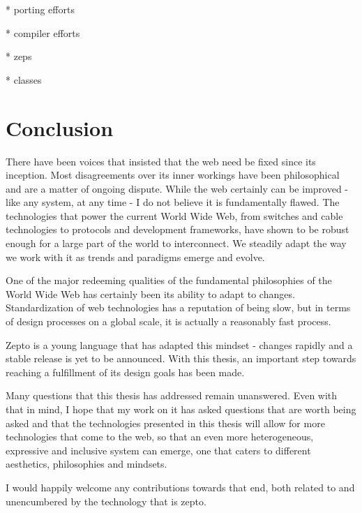 \documentclass[oneside,11pt,xetex]{scrbook}
\begin{document}
* porting efforts

* compiler efforts

* zeps

* classes

\chapter{Conclusion}
\label{chap:conclusion}

There have been voices that insisted that the web need be fixed
since its inception. Most disagreements over its inner workings
have been philosophical and are a matter of ongoing dispute.
While the web certainly can be improved - like any system,
at any time - I do not believe it is fundamentally flawed. The
technologies that power the current World Wide Web, from switches
and cable technologies to protocols and development frameworks,
have shown to be robust enough for a large part of the world
to interconnect. We steadily adapt the way we work with it
as trends and paradigms emerge and evolve.

One of the major redeeming qualities of the fundamental
philosophies of the World Wide Web has certainly been
its ability to adapt to changes. Standardization of web
technologies has a reputation of being slow, but in terms
of design processes on a global scale, it is actually a
reasonably fast process.

Zepto is a young language that has adapted this mindset -
changes rapidly and a stable release is yet to be announced.
With this thesis, an important step towards reaching a fulfillment
of its design goals has been made.

Many questions that this thesis has addressed remain unanswered.
Even with that in mind, I hope that my work on it has asked
questions that are worth being asked and that the technologies
presented in this thesis will allow for more technologies that
come to the web, so that an even more heterogeneous,
expressive and inclusive system can emerge, one that
caters to different aesthetics, philosophies and mindsets.

I would happily welcome any contributions towards that
end, both related to and unencumbered by the technology
that is zepto.



\backmatter


\printbibliography[title=References,heading=bibintoc]
\end{document}
